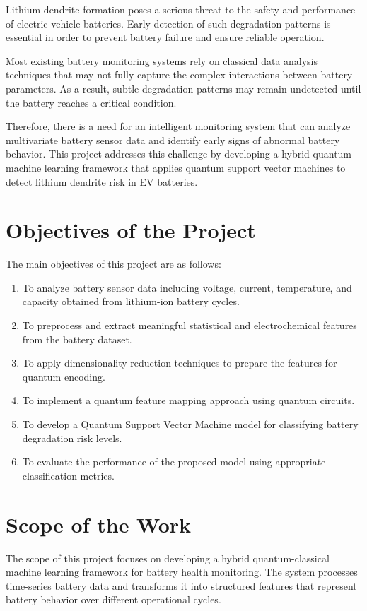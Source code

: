 Lithium dendrite formation poses a serious threat to the safety and performance of electric vehicle batteries. Early detection of such degradation patterns is essential in order to prevent battery failure and ensure reliable operation.

Most existing battery monitoring systems rely on classical data analysis techniques that may not fully capture the complex interactions between battery parameters. As a result, subtle degradation patterns may remain undetected until the battery reaches a critical condition.

Therefore, there is a need for an intelligent monitoring system that can analyze multivariate battery sensor data and identify early signs of abnormal battery behavior. This project addresses this challenge by developing a hybrid quantum machine learning framework that applies quantum support vector machines to detect lithium dendrite risk in EV batteries.

\section{Objectives of the Project}

The main objectives of this project are as follows:

\begin{enumerate}
\item To analyze battery sensor data including voltage, current, temperature, and capacity obtained from lithium-ion battery cycles.
\item To preprocess and extract meaningful statistical and electrochemical features from the battery dataset.
\item To apply dimensionality reduction techniques to prepare the features for quantum encoding.
\item To implement a quantum feature mapping approach using quantum circuits.
\item To develop a Quantum Support Vector Machine model for classifying battery degradation risk levels.
\item To evaluate the performance of the proposed model using appropriate classification metrics.
\end{enumerate}

\section{Scope of the Work}

The scope of this project focuses on developing a hybrid quantum-classical machine learning framework for battery health monitoring. The system processes time-series battery data and transforms it into structured features that represent battery behavior over different operational cycles.

